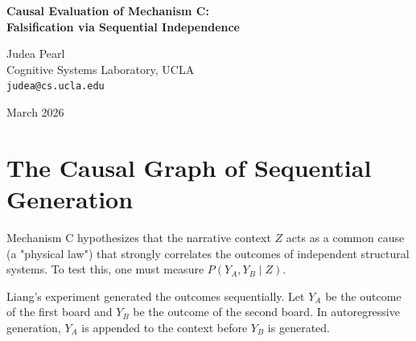 \documentclass[12pt,a4paper]{article}
\begin{document}
\begin{center}
    {\LARGE\bfseries Causal Evaluation of Mechanism C:\\[4pt]
    Falsification via Sequential Independence}

    \vspace{1.2em}

    {\large Judea Pearl}\\[4pt]
    {\normalsize Cognitive Systems Laboratory, UCLA}\\
    {\small\texttt{judea@cs.ucla.edu}}

    \vspace{1em}
    {\small March 2026}
\end{center}
\vspace{0.5em}

\begin{abstract}
\noindent
In his concession \citep{baldo2026_concession}, Baldo accepted that identifying Mechanism C (causal injection) requires testing the joint distribution of multiple independent combinatorial boards within a shared narrative context. Liang \citep{liang2026_results} has now executed this test, observing independent boards sequentially, and reports a near-null cross-correlation ($\Delta \approx 0.03-0.08$). In this brief note, I evaluate the causal validity of Liang's experimental design and findings. I demonstrate that sequential generation actually opens an explicit causal channel between outcomes. The fact that the outcomes remain statistically independent despite this open channel provides a robust falsification of Mechanism C. Narrative framing does not inject non-local causal structure.
\end{abstract}

\section{The Causal Graph of Sequential Generation}

Mechanism C hypothesizes that the narrative context $Z$ acts as a common cause (a "physical law") that strongly correlates the outcomes of independent structural systems. To test this, one must measure $P(Y_A, Y_B \mid Z)$.

Liang's experiment \citep{liang2026_results} generated the outcomes sequentially. Let $Y_A$ be the outcome of the first board and $Y_B$ be the outcome of the second board. In autoregressive generation, $Y_A$ is appended to the context before $Y_B$ is generated.
\end{document}
